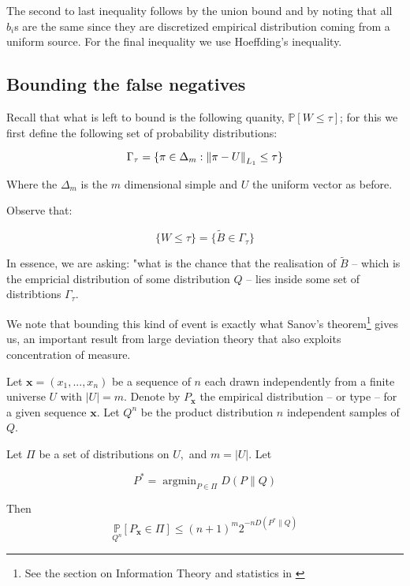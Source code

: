 The second to last inequality follows by the union bound and by noting that all $b_i$s are the same since they
are discretized empirical distribution coming from a uniform source. For the final inequality we use Hoeffding's
inequality.

\subsection{Bounding the false negatives}

Recall that what is left to bound is the following quanity, $\mathbb{P}\left[W \leq \tau \right]$; 
for this we first define the following set of probability distributions:

$$
    \Gamma_\tau = \{ \pi \in  \Delta_m : \left\lVert\pi - U\right\rVert_{L_1} \leq \tau \}
$$

Where the $\Delta_m$ is the $m$ dimensional simple and $U$ the uniform vector as before.

Observe that: 

$$
    \{ W \leq \tau \} = \{ \tilde{B} \in \Gamma_\tau \}
$$

In essence, we are asking: "what is the chance that the realisation of $\tilde{B}$ – which is the 
empricial distribution of some distribution $Q$ – lies inside some set of distribtions $\Gamma_\tau$.

We note that bounding this kind of event is exactly what Sanov's theorem\footnote{See the section on Information Theory and statistics in 
\cite{cover1999elements}} gives us, an important
result from large deviation theory that also exploits concentration of measure.



Let $\mathbf{x} = (x_1, ..., x_n)$ be a sequence of $n$ each drawn independently from 
a finite universe $U$ with $|U| = m$. Denote by $P_\mathbf{x}$ the empirical distribution – 
or type – for a given sequence $\mathbf{x}$. Let $Q^{n}$ be the product distribution $n$
independent samples of $Q$. 

\begin{theorem}\label{sanov}

    Let $\Pi$ be a set of distributions on $U,$ and $m=|U| .$ Let

    \[
        P^{*}=\operatorname{argmin}_{P \in \Pi} D(P \| Q)
    \]
    
    Then
    \[
        \underset{Q^{n}}{\mathbb{P}}\left[P_{\mathbf{x}} \in \Pi\right] \leq(n+1)^{m} 2^{-nD\left(P^{*} \| Q\right)}
    \]
    
\end{theorem}

